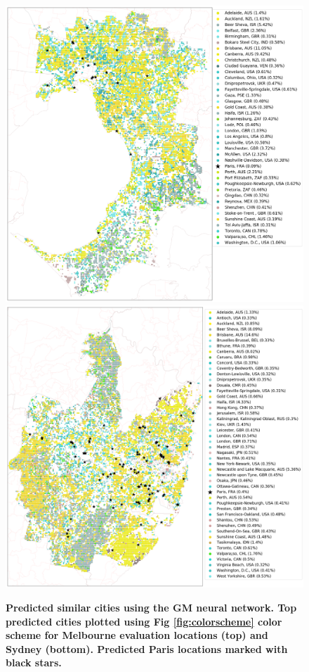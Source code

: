 \documentclass[10pt,letterpaper]{article}
\begin{document}
\begin{figure}[!htbp]
\centering    
\includegraphics[scale=0.16]{Images/MelbourneOverallAbrev_maps.png} 
\includegraphics[scale=0.16]{Images/SydneyOverallAbrev_maps.png}  
\caption{\bf Predicted similar cities using the GM neural network. Top predicted cities plotted using Fig \ref{fig:colorscheme} color scheme for Melbourne evaluation locations (top) and Sydney (bottom). Predicted Paris locations marked with black stars.}    
 \label{fig:melmaps}  
\end{figure} 
\end{document}
